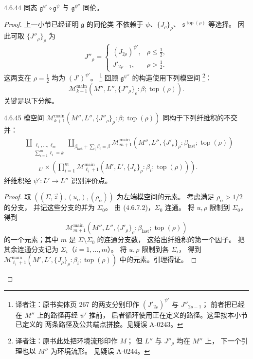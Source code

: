 \begin{theorem}{4.6.44}\label{thm:4-6-44}
同态 $\mathfrak g^{\psi'}\circ\mathfrak g^\psi$
与 $\mathfrak g^{\psi''}$ 同伦。
\end{theorem}
\begin{proof}
上一小节已经证明 $\mathfrak g$ 的同伦类
不依赖于 $\psi$、$\{J_\rho\}_\rho$、
$\mathfrak s^{\operatorname{top}(\rho)}$ 等选择。
因此可取 $\{J''_\rho\}_\rho$ 为
\[
J''_\rho=
\begin{cases}
 (J_{2\rho})^{\psi'},&\rho\leq \frac12,\\
 J'_{2\rho-1},&\rho>\frac12.
\end{cases}
\]
这两支在 $\rho=\frac12$ 均为 $(J')^{\psi'}$。
\footnote{译者注：原书实体页 267 的两支分别印作
$(J'_{2\rho})^{\psi'}$ 与 $J''_{2\rho-1}$；
前者把已经在 $M''$ 上的路径再经 $\psi'$ 推前，
后者循环使用正在定义的路径。这里按本小节已定义的
两条路径及公共端点拼接。见疑误 A-0243。}
回顾 $\mathfrak g^{\psi''}$ 的构造使用下列模空间
\footnote{译者注：原书此处把环境流形印作 $M$；
但 $L''$ 与 $J''_\rho$ 均在 $M''$ 上，
下一个引理也以 $M''$ 为环境流形。
见疑误 A-0244。}：
\[
\mathcal M_{k+1}^{\mathrm{main}}
(M'',L'',\{J''_\rho\}_\rho:
\beta;\operatorname{top}(\rho)).
\]
关键是以下分解。

\begin{lemma}{4.6.45}\label{lem:4-6-45}
模空间
$\mathcal M_{k+1}^{\mathrm{main}}
(M'',L'',\{J''_\rho\}_\rho:
\beta;\operatorname{top}(\rho))$
同构于下列纤维积的不交并：
\[
\begin{aligned}
&\coprod_{\substack{\ell_1,\ldots,\ell_m\\
                    \sum_{i=1}^m\ell_i=k}}
 \coprod_{\beta_{\mathrm{last}}+\sum_i\beta_i=\beta}
\mathcal M_{m+1}^{\mathrm{main}}
(M'',L'',\{J'_\rho\}_\rho:
\beta_{\mathrm{last}};\operatorname{top}(\rho))\\[-1mm]
&\qquad {}_{L'}\!\times
\left(
\prod_{i=1}^m
\mathcal M_{\ell_i+1}^{\mathrm{main}}
(M',L',\{J_\rho\}_\rho:
\beta_i;\operatorname{top}(\rho))
\right).
\end{aligned}
\]
纤维积经 $\psi'\colon L'\to L''$ 识别评价点。
\end{lemma}
\begin{proof}
取
$((\Sigma,\vec z),(u_\alpha),(\rho_\alpha))$
为左端模空间的元素。
考虑满足 $\rho_\alpha>1/2$ 的分支，
并记这些分支的并为 $\Sigma_0$。
由 (4.6.7.2)，$\Sigma_0$ 连通。
将 $u,\rho$ 限制到 $\Sigma_0$，
得到
\[
\mathcal M_{m+1}^{\mathrm{main}}
(M'',L'',\{J'_\rho\}_\rho:
\beta_{\mathrm{last}};\operatorname{top}(\rho))
\]
的一个元素；其中 $m$ 是
$\Sigma\setminus\Sigma_0$ 的连通分支数，
这给出纤维积的第一个因子。
把其余连通分支记为
$\Sigma_i$（$i=1,\ldots,m$）。
将 $u,\rho$ 限制到各 $\Sigma_i$，
得到
$\mathcal M_{\ell_i+1}^{\mathrm{main}}
(M',L',\{J_\rho\}_\rho:
\beta_i;\operatorname{top}(\rho))$
中的元素。引理得证。
\end{proof}


\end{proof}
